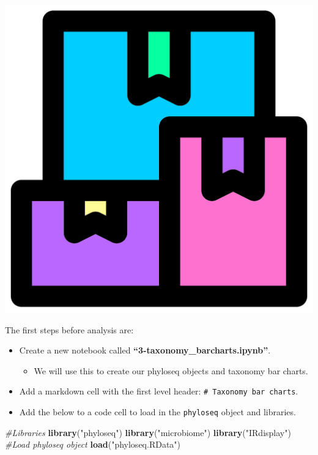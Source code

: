 \documentclass[
]{book}
\newenvironment{Shaded}{\begin{snugshade}}{\end{snugshade}}
\newcommand{\CommentTok}[1]{\textcolor[rgb]{0.56,0.35,0.01}{\textit{#1}}}
\newcommand{\FunctionTok}[1]{\textcolor[rgb]{0.13,0.29,0.53}{\textbf{#1}}}
\newcommand{\NormalTok}[1]{#1}
\newcommand{\StringTok}[1]{\textcolor[rgb]{0.31,0.60,0.02}{#1}}
\providecommand{\tightlist}{%
  \setlength{\itemsep}{0pt}\setlength{\parskip}{0pt}}
\begin{document}
\includegraphics{figures/packages.png}

The first steps before analysis are:

\begin{itemize}
\tightlist
\item
  Create a new notebook called \textbf{``3-taxonomy\_barcharts.ipynb''}.

  \begin{itemize}
  \tightlist
  \item
    We will use this to create our phyloseq objects and taxonomy bar charts.
  \end{itemize}
\item
  Add a markdown cell with the first level header: \texttt{\#\ Taxonomy\ bar\ charts}.
\item
  Add the below to a code cell to load in the \texttt{phyloseq} object and libraries.
\end{itemize}

\begin{Shaded}
\begin{Highlighting}[]
\CommentTok{\#Libraries}
\FunctionTok{library}\NormalTok{(}\StringTok{"phyloseq"}\NormalTok{)}
\FunctionTok{library}\NormalTok{(}\StringTok{"microbiome"}\NormalTok{)}
\FunctionTok{library}\NormalTok{(}\StringTok{"IRdisplay"}\NormalTok{)}
\CommentTok{\#Load phyloseq object}
\FunctionTok{load}\NormalTok{(}\StringTok{"phyloseq.RData"}\NormalTok{)}
\end{Highlighting}
\end{Shaded}
\end{document}
